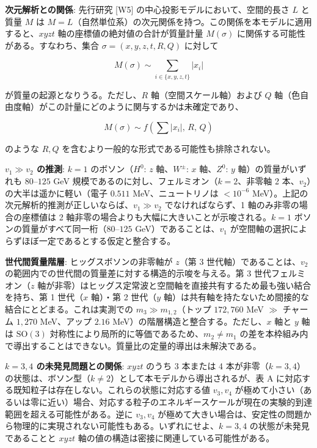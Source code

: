 \documentclass[
  a4paper,11pt]{ltjsarticle}
\theoremstyle{definition}
\theoremstyle{remark}
\begin{document}
\textbf{次元解析との関係}: 先行研究 {[}W5{]}
の中心投影モデルにおいて、空間的長さ \(L\) と質量 \(M\) は
\(M = L\)（自然単位系）の次元関係を持つ。この関係を本モデルに適用すると、\(xyzt\)
軸の座標値の絶対値の合計が質量計量 \(M(\sigma)\)
に関係する可能性がある。すなわち、集合 \(\sigma = (x, y, z, t, R, Q)\)
に対して

\[M(\sigma) \sim \sum_{i \in \{x, y, z, t\}} |x_i|\]

が質量の起源となりうる。ただし、\(R\) 軸（空間スケール軸）および \(Q\)
軸（色自由度軸）がこの計量にどのように関与するかは未確定であり、

\[M(\sigma) \sim f\!\left(\sum |x_i|,\, R,\, Q\right)\]

のような \(R, Q\) を含むより一般的な形式である可能性も排除されない。

\textbf{\(v_1 \gg v_2\) の推測}: \(k = 1\) のボソン（\(H^0\): \(z\)
軸、\(W^\pm\): \(x\) 軸、\(Z^0\): \(y\) 軸）の質量がいずれも
\(80\)--\(125\) GeV 規模であるのに対し、フェルミオン（\(k = 2\)、非零軸
2 本、\(v_2\)）の大半は遥かに軽い（電子 \(0.511\) MeV、ニュートリノは
\(< 10^{-6}\) MeV）。上記の次元解析的推測が正しいならば、\(v_1 \gg v_2\)
でなければならず、1 軸のみ非零の場合の座標値は 2
軸非零の場合よりも大幅に大きいことが示唆される。\(k = 1\)
ボソンの質量がすべて同一桁（\(80\)--\(125\) GeV）であることは、\(v_1\)
が空間軸の選択によらずほぼ一定であるとする仮定と整合する。

\textbf{世代間質量階層}: ヒッグスボソンの非零軸が \(z\)（第 3
世代軸）であることは、\(v_2\)
の範囲内での世代間の質量差に対する構造的示唆を与える。第 3
世代フェルミオン（\(z\)
軸が非零）はヒッグス定常波と空間軸を直接共有するため最も強い結合を持ち、第
1 世代（\(x\) 軸）・第 2 世代（\(y\)
軸）は共有軸を持たないため間接的な結合にとどまる。これは実測での
\(m_3 \gg m_{1,2}\)（トップ \(172{,}760\) MeV \(\gg\) チャーム
\(1{,}270\) MeV、アップ \(2.16\)
MeV）の階層構造と整合する。ただし、\(x\) 軸と \(y\) 軸は
\(\mathrm{SO}(3)\) 対称性により局所的に等価であるため、\(m_2 \neq m_1\)
の差を本枠組み内で導出することはできない。質量比の定量的導出は未解決である。

\textbf{\(k = 3, 4\) の未発見問題との関係}: \(xyzt\) のうち 3 本または 4
本が非零（\(k = 3, 4\)）の状態は、ボソン型（\(k \neq 2\)）として本モデルから導出されるが、表
A に対応する既知粒子は存在しない。これらの状態に対応する値 \(v_3, v_4\)
が極めて小さい（あるいは零に近い）場合、対応する粒子のエネルギースケールが現在の実験的到達範囲を超える可能性がある。逆に
\(v_3, v_4\)
が極めて大きい場合は、安定性の問題から物理的に実現されない可能性もある。いずれにせよ、\(k = 3, 4\)
の状態が未発見であることと \(xyzt\)
軸の値の構造は密接に関連している可能性がある。
\end{document}
